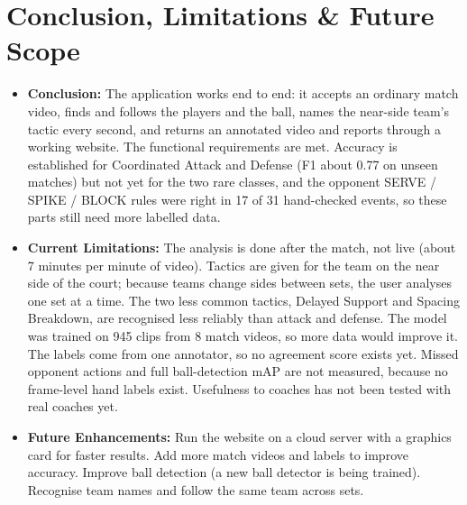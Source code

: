\documentclass[11pt, a4paper]{article}
\begin{document}
\section{Conclusion, Limitations \& Future Scope}
\begin{itemize}[noitemsep, topsep=2pt]
    \item \textbf{Conclusion:} The application works end to end: it accepts an ordinary match video, finds and follows the players and the ball, names the near-side team's tactic every second, and returns an annotated video and reports through a working website. The functional requirements are met. Accuracy is established for Coordinated Attack and Defense (F1 about 0.77 on unseen matches) but not yet for the two rare classes, and the opponent SERVE / SPIKE / BLOCK rules were right in 17 of 31 hand-checked events, so these parts still need more labelled data.
    \item \textbf{Current Limitations:} The analysis is done after the match, not live (about 7 minutes per minute of video). Tactics are given for the team on the near side of the court; because teams change sides between sets, the user analyses one set at a time. The two less common tactics, Delayed Support and Spacing Breakdown, are recognised less reliably than attack and defense. The model was trained on 945 clips from 8 match videos, so more data would improve it. The labels come from one annotator, so no agreement score exists yet. Missed opponent actions and full ball-detection mAP are not measured, because no frame-level hand labels exist. Usefulness to coaches has not been tested with real coaches yet.
    \item \textbf{Future Enhancements:} Run the website on a cloud server with a graphics card for faster results. Add more match videos and labels to improve accuracy. Improve ball detection (a new ball detector is being trained). Recognise team names and follow the same team across sets.
\end{itemize}
\end{document}
